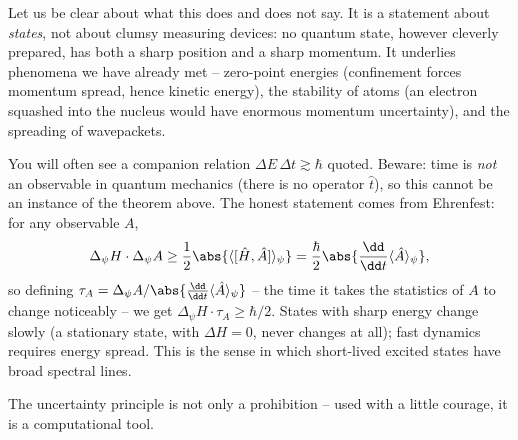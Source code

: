Let us be clear about what this does and does not say. It is a statement about \emph{states}, not about clumsy measuring devices: no quantum state, however cleverly prepared, has both a sharp position and a sharp momentum. It underlies phenomena we have already met -- zero-point energies (confinement forces momentum spread, hence kinetic energy), the stability of atoms (an electron squashed into the nucleus would have enormous momentum uncertainty), and the spreading of wavepackets.

\begin{remark}
    You will often see a companion relation $\Delta E \, \Delta t \gtrsim \hbar$ quoted. Beware: time is \emph{not} an observable in quantum mechanics (there is no operator $\hat{t}$), so this cannot be an instance of the theorem above. The honest statement comes from Ehrenfest: for any observable $A$,
    $$
    \Delta_\psi H \cdot \Delta_\psi A \geq \frac{1}{2}\abs{\langle [\hat H, \hat A] \rangle_\psi} = \frac{\hbar}{2} \abs{\frac{\dd}{\dd t} \langle \hat{A} \rangle_\psi},
    $$
    so defining $\tau_A = \Delta_\psi A / \abs{\frac{\dd}{\dd t}\langle \hat A \rangle_\psi}$ -- the time it takes the statistics of $A$ to change noticeably -- we get $\Delta_\psi H \cdot \tau_A \geq \hbar/2$. States with sharp energy change slowly (a stationary state, with $\Delta H = 0$, never changes at all); fast dynamics requires energy spread. This is the sense in which short-lived excited states have broad spectral lines.
\end{remark}

The uncertainty principle is not only a prohibition -- used with a little courage, it is a computational tool.

